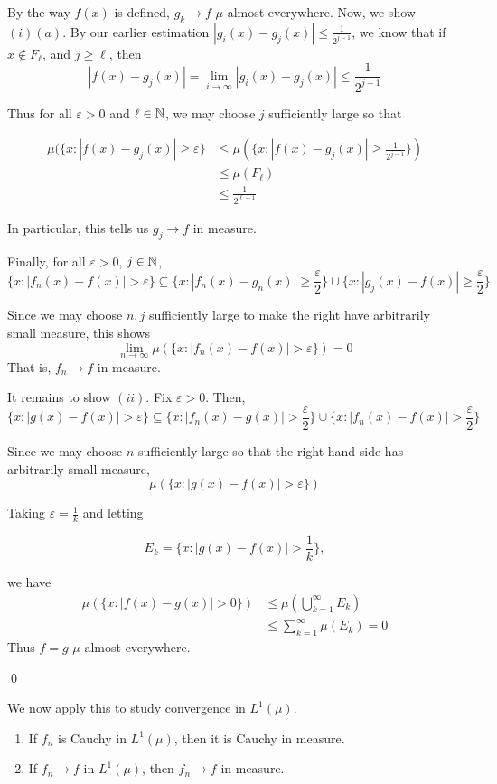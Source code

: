 \documentclass[x11names,reqno,14pt]{extarticle}
\newcommand*{\oo}{\infty}
\newcommand{\seq}[1]{_{#1 = 1}^\oo}
\begin{document}
By the way $f(x)$ is defined, $g_k\to f$ $\mu$-almost everywhere. Now, we show $(i)(a)$. By our earlier estimation $|g_i(x) - g_j(x)| \leq \frac{1}{2^{j - 1}}$, we know that if $x\not\in F_\ell$, and $j\geq \ell$, then
\[
|f(x) - g_j(x)| = \lim_{i\to\oo}|g_i(x) - g_j(x)| \leq \frac{1}{2^{j - 1}}
\]

Thus for all $\varepsilon>0$ and $\ell \in \mathbb{N}$, we may choose $j$ sufficiently large so that

\begin{align*}
\mu(\{x: |f(x) - g_j(x)| \geq \varepsilon\} &  \leq \mu(\{x: |f(x) - g_j(x)| \geq \frac{1}{2^{j - 1}}\})\\
& \leq \mu(F_\ell) \\
& \leq \frac{1}{2^{\ell - 1}}
\end{align*}

In particular, this tells us $g_j\to f$ in measure. 

Finally, for all $\varepsilon> 0$, $j \in \mathbb{N}$, 
\[
\{x: |f_n(x) - f(x)| > \varepsilon\} \subseteq \{x: |f_n(x) - g_n(x)| \geq \frac{\varepsilon}{2}\} \cup \{x: |g_j(x) - f(x)| \geq \frac{\varepsilon}{2}\}
\]

Since we may choose $n, j$ sufficiently large to make the right have arbitrarily small measure, this shows
\[
\lim_{n\to\oo}\mu(\{x: |f_n(x) - f(x)| > \varepsilon\}) = 0
\]
That is, $f_n\to f$ in measure. 

It remains to show $(ii)$. Fix $\varepsilon>0$. Then, 
\[
\{x: |g(x) - f(x)| > \varepsilon\} \subseteq \{x: |f_n(x) - g(x)| > \frac{\varepsilon}{2}\} \cup \{x:|f_n(x) - f(x)| > \frac{\varepsilon}{2}\}
\]

Since we may choose $n$ sufficiently large so that the right hand side has arbitrarily small measure, 
\[
\mu(\{x: |g(x) - f(x)| > \varepsilon\})
\]

Taking $\varepsilon=\frac{1}{k}$ and letting

\[
E_k = \{x: |g(x) - f(x)| > \frac{1}{k}\},
\]

we have
\begin{align*}
\mu(\{x: |f(x) - g(x)| > 0 \}) & \leq \mu\left(\bigcup\seq{k}E_k\right)\\
& \leq \sum\seq{k}\mu(E_k) = 0
\end{align*}
Thus $f = g$ $\mu$-almost everywhere. 

\qed

We now apply this to study convergence in $L^1(\mu)$. 

\prop
\begin{enumerate}[label=(\alph*)]
\item If $f_n$ is Cauchy in $L^1(\mu)$, then it is Cauchy in measure.
\item If $f_n\to f$ in $L^1(\mu)$, then $f_n\to f$ in measure.
\end{enumerate}
\end{document}
